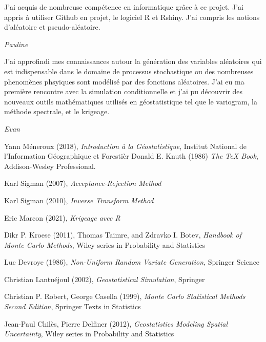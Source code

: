 \documentclass[10pt]{article} %
\begin{document}
\epigraph{J'ai acquis de nombreuse compétence en informatique grâce à ce projet. J'ai appris à utiliser Github en projet,
le logiciel R et Rshiny. J'ai compris les notions d'aléatoire et pseudo-aléatoire.}
 {\textit{Pauline}}

\epigraph{J'ai approfindi mes connaissances autour la génération des variables aléatoires qui est indispensable dans le domaine
de processus stochastique ou des nombreuses phenomènes phsyiques sont modélisé par des fonctions aléatoires. J'ai eu ma première rencontre
avec la simulation conditionnelle et j'ai pu découvrir des nouveaux outils mathématiques utilisés en géostatistique tel que le variogram, la méthode spectrale,
et le krigeage.}
 {\textit{Evan}}


\newpage

\begin{thebibliography}{9}
    Yann Méneroux (2018), \emph{Introduction à la Géostatistique}, Institut National de l'Information Géographique et Forestièr
    Donald E. Knuth (1986) \emph{The \TeX{} Book}, Addison-Wesley Professional.

    Karl Sigman (2007), \emph{Acceptance-Rejection Method}

    Karl Sigman (2010), \emph{Inverse Transform Method}

    Eric Marcon (2021), \emph{Krigeage avec R}

    Dikr P. Kroese (2011), Thomas Taimre, and Zdravko I. Botev, \emph{Handbook of Monte Carlo Methods}, Wiley series in Probability and Statistics

    Luc Devroye (1986), \emph{Non-Uniform Random Variate Generation}, Springer Science

    Christian Lantuéjoul (2002), \emph{Geostatistical Simulation}, Springer

    Christian P. Robert, George Casella (1999), \emph{Monte Carlo Statistical Methods Second Edition}, Springer Texts in Statistics

    Jean-Paul Chilès, Pierre Delfiner (2012), \emph{Geostatistics Modeling Spatial Uncertainty}, Wiley series in Probability and Statistics

    \end{thebibliography}
\end{document}
